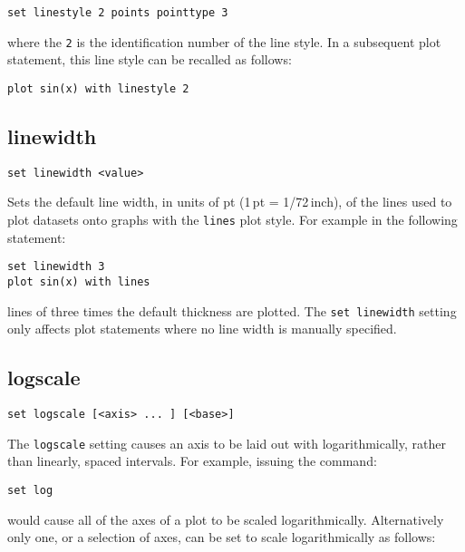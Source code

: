 \begin{verbatim}
set linestyle 2 points pointtype 3
\end{verbatim}

\noindent where the {\tt 2} is the identification number of the line style.
In a subsequent plot statement, this line style can be recalled as follows:

\begin{verbatim}
plot sin(x) with linestyle 2
\end{verbatim}


\subsection{linewidth}

\begin{verbatim}
set linewidth <value>
\end{verbatim}

Sets the default line width, in units of pt (1\,pt = 1/72\,inch), of the lines
used to plot datasets onto graphs with the {\tt lines} plot style.  For
example in the following statement:

\begin{verbatim}
set linewidth 3
plot sin(x) with lines
\end{verbatim}

\noindent lines of three times the default thickness are plotted.  The
{\tt set linewidth} setting only affects plot statements where no line width is
manually specified.

\subsection{logscale}

\begin{verbatim}
set logscale [<axis> ... ] [<base>]
\end{verbatim}

The {\tt logscale} setting causes an axis to be laid out with logarithmically,
rather than linearly, spaced intervals.  For example, issuing the command:

\begin{verbatim}
set log
\end{verbatim}

\noindent would cause all of the axes of a plot to be scaled logarithmically. Alternatively
only one, or a selection of axes, can be set to scale logarithmically as
follows:

